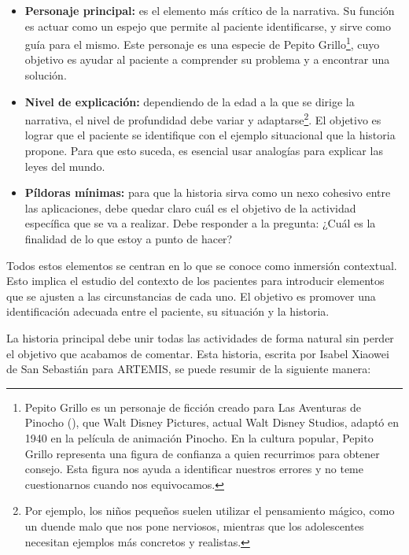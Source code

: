 \begin{itemize}
	\item \textbf{Personaje principal:} es el elemento más crítico de la narrativa. Su función es actuar como un espejo que permite al paciente identificarse, y sirve como guía para el mismo. Este personaje es una especie de Pepito Grillo\footnote{Pepito Grillo es un personaje de ficción creado para Las Aventuras de Pinocho (\cite{LADP:1883}), que Walt Disney Pictures, actual Walt Disney Studios, adaptó en 1940 en la película de animación Pinocho. En la cultura popular, Pepito Grillo representa una figura de confianza a quien recurrimos para obtener consejo. Esta figura nos ayuda a identificar nuestros errores y no teme cuestionarnos cuando nos equivocamos.}, cuyo objetivo es ayudar al paciente a comprender su problema y a encontrar una solución.
	\item \textbf{Nivel de explicación:} dependiendo de la edad a la que se dirige la narrativa, el nivel de profundidad debe variar y adaptarse\footnote{Por ejemplo, los niños pequeños suelen utilizar el pensamiento mágico, como un duende malo que nos pone nerviosos, mientras que los adolescentes necesitan ejemplos más concretos y realistas.}. El objetivo es lograr que el paciente se identifique con el ejemplo situacional que la historia propone. Para que esto suceda, es esencial usar analogías para explicar las leyes del mundo.
	\item \textbf{Píldoras mínimas:} para que la historia sirva como un nexo cohesivo entre las aplicaciones, debe quedar claro cuál es el objetivo de la actividad específica que se va a realizar. Debe responder a la pregunta: ¿Cuál es la finalidad de lo que estoy a punto de hacer?
\end{itemize}

Todos estos elementos se centran en lo que se conoce como inmersión contextual. Esto implica el estudio del contexto de los pacientes para introducir elementos que se ajusten a las circunstancias de cada uno. El objetivo es promover una identificación adecuada entre el paciente, su situación y la historia.

La historia principal debe unir todas las actividades de forma natural sin perder el objetivo que acabamos de comentar. Esta historia, escrita por Isabel Xiaowei de San Sebastián para ARTEMIS, se puede resumir de la siguiente manera:

